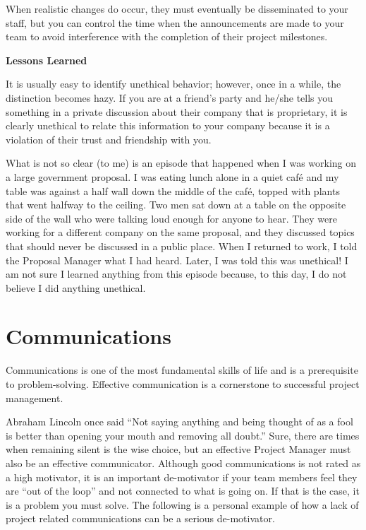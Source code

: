 \documentclass{book}
\begin{document}
When realistic changes do occur, they must eventually
be disseminated to your staff, but you can control the time
when the announcements are made to your team to avoid
interference with the completion of their project milestones.

\textbf{Lessons Learned}

It is usually easy to identify
unethical behavior; however, once in a while, the
distinction becomes hazy. If you are at a friend’s
party and he/she tells you something in a private
discussion about their company that is proprietary,
it is clearly unethical to relate this information
to your company because it is a violation of
their trust and friendship with you.

What is not so clear (to me) is an episode
that happened when I was working on a large
government proposal. I was eating lunch alone
in a quiet café and my table was against a half
wall down the middle of the café, topped with
plants that went halfway to the ceiling. Two men
sat down at a table on the opposite side of the
wall who were talking loud enough for anyone to
hear. They were working for a different company
on the same proposal, and they discussed topics
that should never be discussed in a public place.
When I returned to work, I told the Proposal Manager what I had heard. Later, I was told this was unethical! I am not sure I learned anything
from this episode because, to this day, I do not
believe I did anything unethical.

\section{Communications}

Communications is one of the most fundamental
skills of life and is a prerequisite to problem-solving.
Effective communication is a cornerstone to successful
project management.

Abraham Lincoln once said “Not saying anything and being
thought of as a fool is better than opening your mouth and
removing all doubt.” Sure, there are times when remaining
silent is the wise choice, but an effective Project Manager
must also be an effective communicator. Although good
communications is not rated as a high motivator, it is an
important de-motivator if your team members feel they are
“out of the loop” and not connected to what is going on. If
that is the case, it is a problem you must solve. The following
is a personal example of how a lack of project related communications
can be a serious de-motivator.
\end{document}
